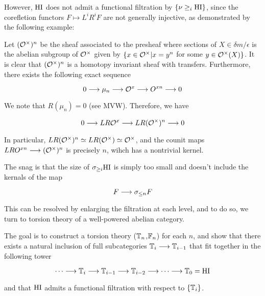 However, $\mathrm{HI}$ does not admit a functional filtration by $\{\nu 
\geq_{i} \mathrm{HI}\}$, since the corefletion functors $F \mapsto 
L^iR^iF$ are not generally injective, as demonstrated by the 
following example: 

\begin{ex}
Let $(\mathcal{O}^{\times})^n$ be the sheaf associated to the presheaf where 
sections of $X \in \delta m /\epsilon$ is the abelian subgroup of 
$\mathcal{O}^{\times}$ given by $\{x \in \mathcal{O}^{\times} | x=y^n$ for some $y \in \mathcal{O}^{\times}(X)\}$. 
It is clear that $(\mathcal{O}^{\times})^n$ is a homotopy invariant sheaf with 
transfers. Furthermore, there exists the following exact sequence 

\begin{equation}
0 \longrightarrow \mu_n \longrightarrow \mathcal{O}^x \longrightarrow O^{xn} 
\longrightarrow 0
\end{equation}

We note that $R(\mu_n) = 0$ (see MVW). Therefore, we have

\begin{equation}
0 \longrightarrow LR\mathcal{O}^x \longrightarrow LR(\mathcal{O}^{\times})^{n} \longrightarrow 0
\end{equation}

In particular, $LR(\mathcal{O}^{\times})^{n} \simeq LR(\mathcal{O}^{\times}) \simeq \mathcal{O}^{\times}$, and the counit 
maps $LRO^{xn} \longrightarrow (\mathcal{O}^{\times})^n$ is precisely $n$, wihch has 
a nontrivial kernel.

The snag is that the size of $\sigma_{\geq i} \mathrm{HI}$ is simply too small 
and doesn't include the kernals of the map

\begin{equation}
F \longrightarrow \sigma_{\leq n} F
\end{equation}

This can be resolved by enlarging the filtration at each level, 
and to do so, we turn to torsion theory of a well-powered abelian 
category.  
\end{ex}

The goal is to construct a torsion theory ($\mathbb{T}_n$,$\mathbb{F}_n$) 
for each $n$, and show that there exists a natural inclusion of 
full subcategories $\mathbb{T}_i \longrightarrow \mathbb{T}_{i-1}$ that fit 
together in the following tower

\begin{equation}
\cdots \longrightarrow \mathbb{T}_i \longrightarrow \mathbb{T}_{i-1} 
\longrightarrow \mathbb{T}_{i-2} \longrightarrow \cdots 
\longrightarrow \mathbb{T}_0 = \mathrm{HI}
\end{equation}

and that $\mathrm{HI}$ admits a functional filtration with respect to 
$\{\mathbb{T}_i\}$.

